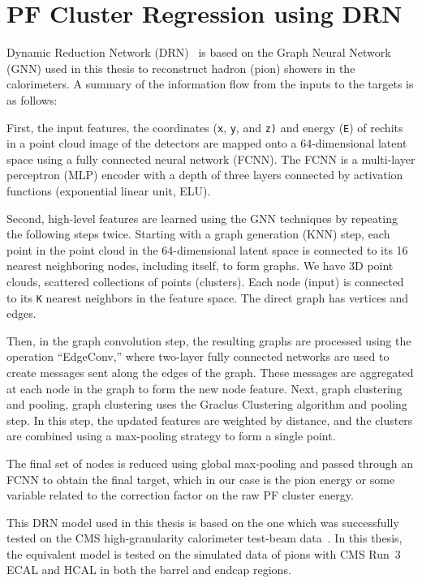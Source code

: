 \section{PF Cluster Regression using DRN}
Dynamic Reduction Network (DRN)~\cite{DGCNN} is based on the Graph Neural Network (GNN) used in this thesis to reconstruct hadron (pion) showers in the calorimeters.
A summary of the information flow from the inputs to the targets is as follows:

First, the input features, the coordinates ({\tt x}, {\tt y}, and {\tt z)} and energy ({\tt E}) of rechits in a point cloud image of the detectors
are mapped onto a 64-dimensional latent space using a fully connected neural network (FCNN).
The FCNN is a multi-layer perceptron (MLP) encoder with a depth of three layers connected by activation functions (exponential linear unit, ELU).

Second, high-level features are learned using the GNN techniques by repeating the following steps twice.
Starting with a graph generation (KNN) step, each point in the point cloud in the 64-dimensional latent space is connected to its 16 nearest neighboring nodes,
including itself, to form graphs.
We have 3D point clouds, scattered collections of points (clusters). Each node (input) is connected to its {\tt K} nearest neighbors in the feature space.
The direct graph has vertices and edges. %

Then, in the graph convolution step, the resulting graphs are processed using the operation “EdgeConv,” where two-layer %
fully connected networks are used to create messages sent along the edges of the graph. These messages are aggregated at each node in the graph to form the new node feature.
Next, graph clustering and pooling, graph clustering uses the Graclus Clustering algorithm and pooling step.
In this step, the updated features are weighted by distance, and the clusters are combined using a max-pooling strategy to form a single point.

The final set of nodes is reduced using global max-pooling and passed through an FCNN to obtain the final target, which in our case is the pion energy or
some variable related to the correction factor on the raw PF cluster energy.

This DRN model used in this thesis is based on the one which was successfully tested on the CMS high-granularity calorimeter test-beam data~\cite{GNN_DRN}.
In this thesis, the equivalent model is tested on the simulated data of pions with CMS Run~3 ECAL and HCAL in both the barrel and endcap regions.

